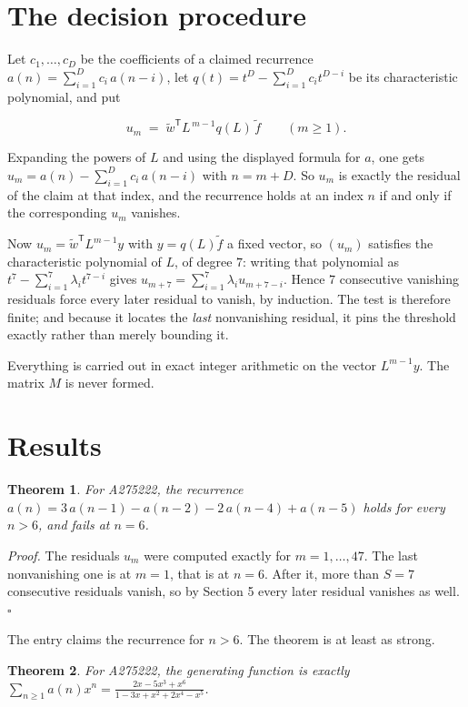 \documentclass[11pt]{article}
\newtheorem{theorem}{Theorem}
\theoremstyle{definition}
\begin{document}
\section{The decision procedure}

Let $c_1,\dots,c_D$ be the coefficients of a claimed recurrence $a(n) = \sum_{i=1}^{D} c_i\,a(n-i)$, let $q(t) = t^{D} - \sum_{i=1}^{D} c_i t^{D-i}$ be its characteristic polynomial, and put

\[u_m \;=\; \tilde w^{\mathsf T} L^{\,m-1} q(L)\,\tilde f \qquad (m \ge 1).\]

Expanding the powers of $L$ and using the displayed formula for $a$, one gets $u_m = a(n) - \sum_{i=1}^{D} c_i\,a(n-i)$ with $n = m + D$. So $u_m$ is exactly the residual of the claim at that index, and the recurrence holds at an index $n$ if and only if the corresponding $u_m$ vanishes.

Now $u_m = \tilde w^{\mathsf T} L^{m-1} y$ with $y = q(L)\tilde f$ a fixed vector, so $(u_m)$ satisfies the characteristic polynomial of $L$, of degree $7$: writing that polynomial as $t^{7} - \sum_{i=1}^{7} \lambda_i t^{7-i}$ gives $u_{m+7} = \sum_{i=1}^{7} \lambda_i u_{m+7-i}$. Hence $7$ consecutive vanishing residuals force every later residual to vanish, by induction. The test is therefore finite; and because it locates the {\itshape last} nonvanishing residual, it pins the threshold exactly rather than merely bounding it.

Everything is carried out in exact integer arithmetic on the vector $L^{m-1}y$. The matrix $M$ is never formed.

\section{Results}

\begin{theorem} For A275222, the recurrence $a(n) = 3\,a(n-1) - a(n-2) - 2\,a(n-4) + a(n-5)$ holds for every $n > 6$, and fails at $n = 6$.\end{theorem}

{\itshape Proof.} The residuals $u_m$ were computed exactly for $m = 1,\dots,47$. The last nonvanishing one is at $m = 1$, that is at $n = 6$. After it, more than $S = 7$ consecutive residuals vanish, so by Section 5 every later residual vanishes as well. $\square$

The entry claims the recurrence for $n > 6$. The theorem is at least as strong.

\begin{theorem} For A275222, the generating function is exactly $\sum_{n\ge 1} a(n)x^n = \frac{2x - 5x^{3} + x^{6}}{1 - 3x + x^{2} + 2x^{4} - x^{5}}$.\end{theorem}
\end{document}
